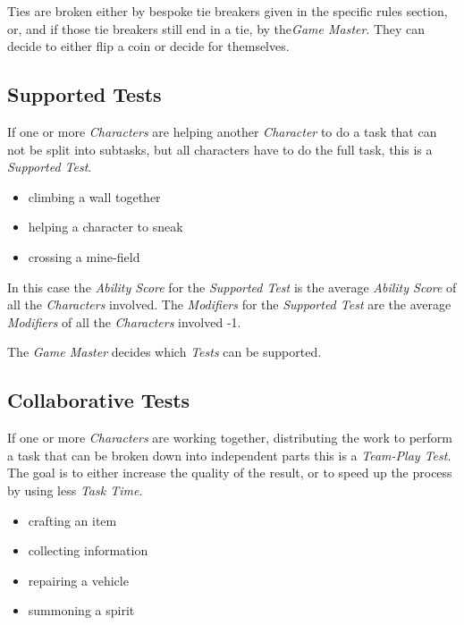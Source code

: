 Ties are broken either by bespoke tie breakers given in the specific rules section,
or, and if those tie breakers still end in a tie, by the\emph{Game Master}. They
can decide to either flip a coin or decide for themselves.

\subsection{Supported Tests}

If one or more \emph{Characters} are helping another \emph{Character} to do a task
that can not be split into subtasks, but all characters have to do the full task,
this is a \emph{Supported Test}.

\begin{itemize}[parsep=0em]
    \item climbing a wall together
    \item helping a character to sneak
    \item crossing a mine-field
\end{itemize}

In this case the \emph{Ability Score} for the \emph{Supported Test} is the average
\emph{Ability Score} of all the \emph{Characters} involved. The \emph{Modifiers}
for the \emph{Supported Test} are the average
\emph{Modifiers} of all the \emph{Characters} involved -1.

The \emph{Game Master} decides which \emph{Tests} can be supported.

\subsection{Collaborative Tests}

If one or more \emph{Characters} are working together, distributing the work to
perform a task that can be broken down into independent parts this is a
\emph{Team-Play Test}. The goal is to either increase the quality of the result, or
to speed up the process by using less \emph{Task Time}.

\begin{itemize}[parsep=0em]
    \item crafting an item
    \item collecting information
    \item repairing a vehicle
    \item summoning a spirit
\end{itemize}

